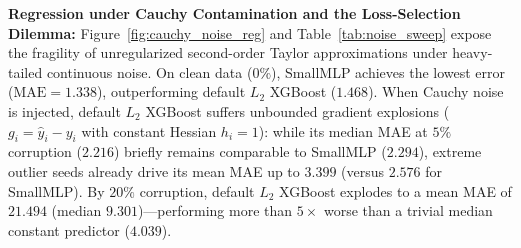 \documentclass{article}
\begin{document}
\begin{table}[H]
\centering
\caption{Mean and Median Test Performance Across Progressive Target Corruption (10/10 Seeds Retained)}
\vspace{4pt}
\label{tab:noise_sweep}
\end{table}

\textbf{Regression under Cauchy Contamination and the Loss-Selection Dilemma:} Figure~\ref{fig:cauchy_noise_reg} and Table~\ref{tab:noise_sweep} expose the fragility of unregularized second-order Taylor approximations under heavy-tailed continuous noise. On clean data ($0\%$), SmallMLP achieves the lowest error ($\text{MAE} = 1.338$), outperforming default $L_2$ XGBoost ($1.468$). When Cauchy noise is injected, default $L_2$ XGBoost suffers unbounded gradient explosions ($g_i = \hat{y}_i - y_i$ with constant Hessian $h_i = 1$): while its median MAE at $5\%$ corruption ($2.216$) briefly remains comparable to SmallMLP ($2.294$), extreme outlier seeds already drive its mean MAE up to $3.399$ (versus $2.576$ for SmallMLP). By $20\%$ corruption, default $L_2$ XGBoost explodes to a mean MAE of $21.494$ (median $9.301$)—performing more than $5\times$ worse than a trivial median constant predictor ($4.039$).
\end{document}
